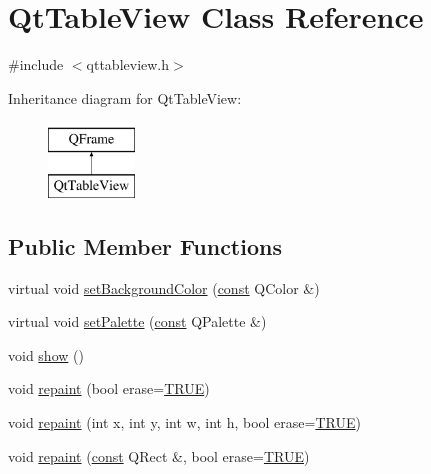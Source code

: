 \hypertarget{classQtTableView}{\section{Qt\+Table\+View Class Reference}
\label{classQtTableView}
}


{\ttfamily \#include $<$qttableview.\+h$>$}

Inheritance diagram for Qt\+Table\+View\+:\begin{figure}[H]
\begin{center}
\leavevmode
\includegraphics[height=2.000000cm]{classQtTableView}
\end{center}
\end{figure}
\subsection*{Public Member Functions}
\begin{DoxyCompactItemize}
\item 
virtual void \hyperlink{classQtTableView_a7d570c84d71fd2668db97c3d6d874e4e}{set\+Background\+Color} (\hyperlink{tradstdc_8h_a2c212835823e3c54a8ab6d95c652660e}{const} Q\+Color \&)
\item 
virtual void \hyperlink{classQtTableView_ac2fa9bee88d57b725616d320fc197832}{set\+Palette} (\hyperlink{tradstdc_8h_a2c212835823e3c54a8ab6d95c652660e}{const} Q\+Palette \&)
\item 
void \hyperlink{classQtTableView_a01099a44c4a3b39917c11a4b0288b449}{show} ()
\item 
void \hyperlink{classQtTableView_a5c79869f8c34d8eac65ffd16a7b1ce59}{repaint} (bool erase=\hyperlink{xpm2img_8c_aa8cecfc5c5c054d2875c03e77b7be15d}{T\+R\+U\+E})
\item 
void \hyperlink{classQtTableView_a219709f1c358e28e007d6739d5501f33}{repaint} (int x, int y, int w, int h, bool erase=\hyperlink{xpm2img_8c_aa8cecfc5c5c054d2875c03e77b7be15d}{T\+R\+U\+E})
\item 
void \hyperlink{classQtTableView_adf2af34ed4ccea63e6996b381b86463f}{repaint} (\hyperlink{tradstdc_8h_a2c212835823e3c54a8ab6d95c652660e}{const} Q\+Rect \&, bool erase=\hyperlink{xpm2img_8c_aa8cecfc5c5c054d2875c03e77b7be15d}{T\+R\+U\+E})
\end{DoxyCompactItemize}

